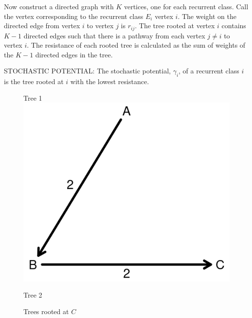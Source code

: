 Now construct a directed graph with $K$ vertices, one for each recurrent class. Call the vertex corresponding to the recurrent class $E_i$ vertex $i$. The weight on the directed edge from vertex $i$ to vertex $j$ is $r_{ij}$. The tree rooted at vertex $i$ contains $K-1$ directed edges such that there is a pathway from each vertex $j \neq i$ to vertex $i$. The resistance of each rooted tree is calculated as the sum of weights of the $K-1$ directed edges in the tree. 

\begin{definition}
    STOCHASTIC POTENTIAL: The stochastic potential, $\gamma_i$, of a recurrent class $i$ is the tree rooted at $i$ with the lowest resistance.
\end{definition}

\begin{figure}[h]
\captionsetup{justification=centering}
  \caption{Trees rooted at $C$}
   \label{fig:TreesTheory2}
\vskip12pt
\begin{minipage}[c]{.32\textwidth}
\centering
Tree 1
\vskip6pt
\includegraphics[width = \textwidth]{Images/Tree1.png}
\end{minipage}
\begin{minipage}[c]{.32\textwidth}
\centering
Tree 2
\vskip6pt

\end{minipage}
\end{figure}
